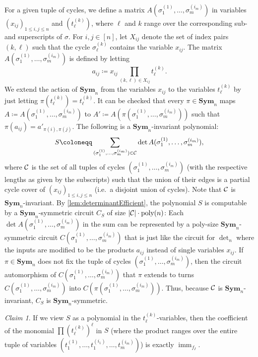 \documentclass[10pt,a4paper]{article}
\theoremstyle{definition}
\theoremstyle{plain}
\theoremstyle{remark}
\newtheorem{claim}{Claim}[definition]
\newcommand{\Cc}{{\cal C}}
\newcommand{\Sym}{\mathbf{Sym}}
\DeclareMathOperator{\imm}{imm}
\begin{document}
For a given tuple of cycles, we define a matrix $A(\sigma_1^{(1)},\dots ,\sigma_{m}^{(i_m)})$ in variables $(x_{ij})_{1 \leq i,j \leq n}$ and $(t_\ell^{(k)})$, where $\ell$ and $k$ range over the corresponding sub- and superscripts of $\sigma$. For $i,j \in [n]$, let $X_{ij}$ denote the set of index pairs $(k,\ell)$ such that the cycle $\sigma_{\ell}^{(k)}$ contains the variable $x_{ij}$. The matrix $A(\sigma_1^{(1)},\dots ,\sigma_{m}^{(i_m)})$ is defined by letting
\[
a_{ij} \coloneqq x_{ij}\prod_{(k,\ell) \in X_{ij}} t^{(k)}_{\ell}. 
\]
We extend the action of $\Sym_n$ from the variables $x_{ij}$ to the variables $t_\ell^{(k)}$ by just letting $\pi(t_\ell^{(k)}) = t_\ell^{(k)}$.
It can be checked that every $\pi \in \Sym_n$ maps $A \coloneqq A(\sigma_1^{(1)},\dots ,\sigma_{m}^{(i_m)})$ to $A' \coloneqq A(\pi(\sigma_1^{(1)},\dots ,\sigma_{m}^{(i_m)}))$ such that $\pi(a_{ij}) = a'_{\pi(i),\pi(j)}$. 
The following is a $\Sym_n$-invariant polynomial:
\[
S \coloneqq \sum_{(\sigma_1^{(1)},\dots ,\sigma_{m}^{(i_m)}) \in \Cc} \det A(\sigma_1^{(1)},\dots ,\sigma_{m}^{(i_m)}),
\]
where $\Cc$ is the set of all tuples of cycles $(\sigma_1^{(1)},\dots ,\sigma_{m}^{(i_m)})$ (with the respective lengths as given by the subscripts) such that the union of their edges is a partial cycle cover of $(x_{ij})_{1 \leq i,j \leq n}$ (i.e.\ a disjoint union of cycles). 
Note that $\Cc$ is $\Sym_n$-invariant. 
By \cref{lem:determinantEfficient}, the polynomial $S$ is computable by a $\Sym_n$-symmetric circuit $C_S$ of size $|\Cc| \cdot \text{poly}(n)$: Each $\det A(\sigma_1^{(1)},\dots ,\sigma_{m}^{(i_m)})$ in the sum can be represented by a poly-size $\Sym_n$-symmetric circuit $C(\sigma_1^{(1)},\dots ,\sigma_{m}^{(i_m)})$ that is just like the circuit for $\det_n$ where the inputs are modified to be the products $a_{ij}$ instead of single variables $x_{ij}$. If $\pi \in \Sym_n$ does not fix the tuple of cycles $(\sigma_1^{(1)},\dots ,\sigma_{m}^{(i_m)})$, then the circuit automorphism of $C(\sigma_1^{(1)},\dots ,\sigma_{m}^{(i_m)})$ that $\pi$ extends to turns $C(\sigma_1^{(1)},\dots ,\sigma_{m}^{(i_m)})$ into $C(\pi(\sigma_1^{(1)},\dots ,\sigma_{m}^{(i_m)}))$. 
Thus, because $\Cc$ is $\Sym_n$-invariant, $C_S$ is $\Sym_n$-symmetric.\\
\begin{claim}\label{imm:claim1} If we view $S$ as a polynomial in the $t_\ell^{(k)}$-variables, then the coefficient of the monomial $\prod (t_\ell^{(k)})^\ell$ in $S$ (where the product ranges over the entire tuple of variables $(t_1^{(1)},\dots ,t_1^{(i_1)},\dots ,t_m^{(i_m)})$) is exactly $\imm_{f_I}$.
\end{claim}
\end{document}
